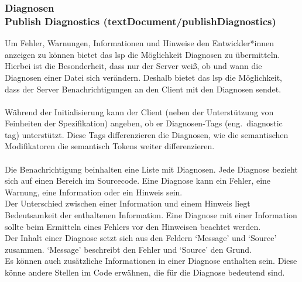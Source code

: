 \documentclass[./einleitung.tex]{subfiles}
\begin{document}
    \subsubsection[Diagnosen]{Diagnosen\\ {\textnormal{\footnotesize Publish Diagnostics (textDocument/publishDiagnostics) \cite{diagnostics}}}}\label{subsubsec:diagnostics}
    Um Fehler, Warnungen, Informationen und Hinweise den Entwickler*innen anzeigen zu können bietet das \acrshort{lsp} die Möglichkeit Diagnosen zu übermitteln.
    Hierbei ist die Besonderheit, dass nur der Server weiß, ob und wann die Diagnosen einer Datei sich verändern.
    Deshalb bietet das \acrshort{lsp} die Möglichkeit, dass der Server Benachrichtigungen an den Client mit den Diagnosen sendet.
    \\\\
    Während der Initialisierung kann der Client (neben der Unterstützung von Feinheiten der Spezifikation) angeben, ob er Diagnosen-Tags (eng.\ diagnostic tag) unterstützt.
    Diese Tags differenzieren die Diagnosen, wie die semantischen Modifikatoren die semantisch Tokens weiter differenzieren.
    \\\\
    Die Benachrichtigung beinhalten eine Liste mit Diagnosen.
    Jede Diagnose bezieht sich auf einen Bereich im Sourcecode.
    Eine Diagnose kann ein Fehler, eine Warnung, eine Information oder ein Hinweis sein.\\
    Der Unterschied zwischen einer Information und einem Hinweis liegt Bedeutsamkeit der enthaltenen Information.
    Eine Diagnose mit einer Information sollte beim Ermitteln eines Fehlers vor den Hinweisen beachtet werden.\\
    Der Inhalt einer Diagnose setzt sich aus den Feldern `Message' und `Source' zusammen.
    `Message' beschreibt den Fehler und `Source' den Grund.\\
    Es können auch zusätzliche Informationen in einer Diagnose enthalten sein.
    Diese könne andere Stellen im Code erwähnen, die für die Diagnose bedeutend sind.
\end{document}
